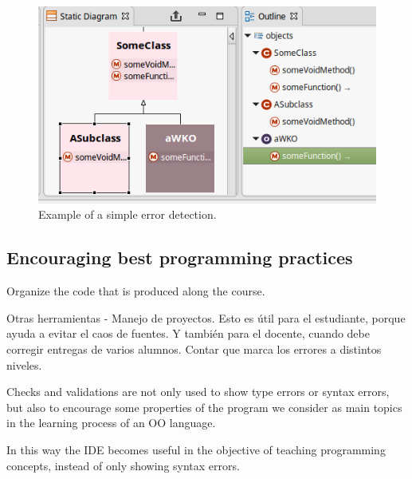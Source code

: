 \begin{figure}[ht]
 \centering
 \includegraphics[scale=0.5]{images/outline.png}
 \caption{\small Example of a simple error detection.}
 \label{fig:outline}
\end{figure}


\subsection{Encouraging best programming practices}
Organize the code that is produced along the course.

Otras herramientas
- Manejo de proyectos. Esto es útil para el estudiante, porque ayuda a evitar el caos de fuentes. Y también para el docente, cuando debe corregir entregas de varios alumnos.
Contar que marca los errores a distintos niveles.

Checks and validations are not only used to show type errors or syntax errors, 
but also to encourage some properties of the program we consider as main topics in the learning process of an OO language.

In this way the IDE becomes useful in the objective of teaching programming concepts, instead of only showing syntax errors.

